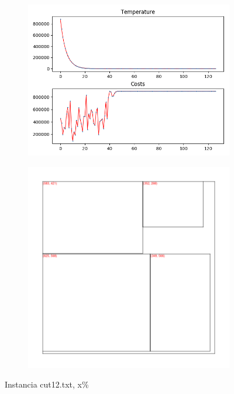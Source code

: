 
\begin{figure}
\centering
\begin{subfigure}{.5\textwidth}
  \centering
  \includegraphics[width=1\linewidth]{results/cut12/1/plot}
  \label{fig:sub1}
\end{subfigure}%
\begin{subfigure}{.5\textwidth}
  \centering
  \includegraphics[width=1\linewidth]{results/cut12/1/cut}
  \label{fig:sub2}
\end{subfigure}
\caption{Instancia cut12.txt, x\%}
\label{fig:test}
\end{figure}


